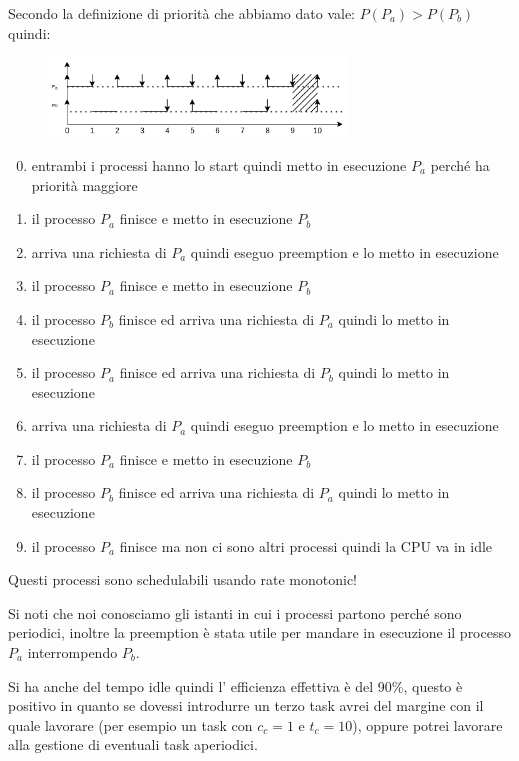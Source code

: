 Secondo la definizione di priorità che abbiamo dato vale: $P(P_a) > P(P_b)$ quindi:
\begin{figure}[H]
    \centering
    \includegraphics[width=300px]{images/4_Scheduling/rate_monotonic.png}
\end{figure}
\begin{enumerate}
    \setcounter{enumi}{-1}
    \item entrambi i processi hanno lo start quindi metto in esecuzione $P_a$ perché ha priorità maggiore
    \item il processo $P_a$ finisce e metto in esecuzione $P_b$
    \item arriva una richiesta di $P_a$ quindi eseguo preemption e lo metto in esecuzione
    \item il processo $P_a$ finisce e metto in esecuzione $P_b$
    \item il processo $P_b$ finisce ed arriva una richiesta di $P_a$ quindi lo metto in esecuzione
    \item il processo $P_a$ finisce ed arriva una richiesta di $P_b$ quindi lo metto in esecuzione
    \item arriva una richiesta di $P_a$ quindi eseguo preemption e lo metto in esecuzione
    \item il processo $P_a$ finisce e metto in esecuzione $P_b$
    \item il processo $P_b$ finisce ed arriva una richiesta di $P_a$ quindi lo metto in esecuzione
    \item il processo $P_a$ finisce ma non ci sono altri processi quindi la CPU va in idle
\end{enumerate}
Questi processi sono schedulabili usando rate monotonic!

Si noti che noi conosciamo gli istanti in cui i processi partono perché sono periodici, inoltre la preemption è stata utile per mandare in esecuzione il processo $P_a$ interrompendo $P_b$.

Si ha anche del tempo idle quindi l' efficienza effettiva è del 90\%, questo è positivo in quanto se dovessi introdurre un terzo task avrei del margine con il quale lavorare (per esempio un task con $c_c = 1$ e $t_c = 10$), oppure potrei lavorare alla gestione di eventuali task aperiodici.


